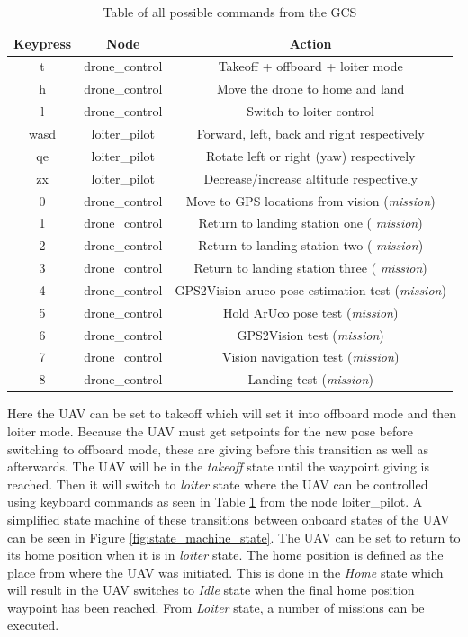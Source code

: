 \documentclass[../Head/report.tex]{subfiles}
\begin{document}
\begin{table}[H]
\centering
\begin{tabular}{ccc}
\hline
\textbf{Keypress} & \textbf{Node} & \textbf{Action}                                    \\ \hline
t                 & drone\_control & Takeoff + offboard + loiter mode         \\
h                 & drone\_control & Move the drone to home and land         \\
l                 & drone\_control & Switch to loiter control 
\\
wasd              & loiter\_pilot & Forward, left, back and right respectively           \\
qe                & loiter\_pilot & Rotate left or right (yaw) respectively             \\
zx                & loiter\_pilot & Decrease/increase altitude respectively
\\
0                 & drone\_control & Move to GPS locations from vision (\textit{mission})
\\
1                 & drone\_control & Return to landing station one ( \textit{mission})
\\
2                 & drone\_control & Return to landing station two ( \textit{mission})
\\
3                 & drone\_control & Return to landing station three ( \textit{mission})
\\
4                 & drone\_control & GPS2Vision aruco pose estimation test (\textit{mission})  
\\
5                 & drone\_control & Hold ArUco pose test (\textit{mission})  
\\
6                 & drone\_control & GPS2Vision test (\textit{mission})  
\\
7                 & drone\_control & Vision navigation test (\textit{mission})
\\
8                 & drone\_control & Landing test (\textit{mission})  
\end{tabular}
\caption{Table of all possible commands from the GCS}
\label{tab:ros_commands}
\end{table}

Here the UAV can be set to takeoff which will set it into offboard mode and then loiter mode. Because the UAV must get setpoints for the new pose before switching to offboard mode, these are giving before this transition as well as afterwards. The UAV will be in the \textit{takeoff} state until the waypoint giving is reached. Then it will switch to \textit{loiter} state where the UAV can be controlled using keyboard commands as seen in Table \ref{tab:ros_commands} from the node loiter\_pilot. A simplified state machine of these transitions between onboard states of the UAV can be seen in Figure \ref{fig:state_machine_state}. The UAV can be set to return to its home position when it is in \textit{loiter} state. The home position is defined as the place from where the UAV was initiated. This is done in the \textit{Home} state which will result in the UAV switches to \textit{Idle} state when the final home position waypoint has been reached. From \textit{Loiter} state, a number of missions can be executed. 
\end{document}
